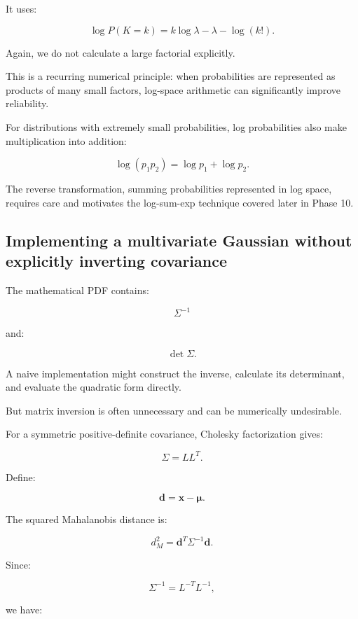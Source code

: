 It uses:

\[
 \log P(K=k) = k\log\lambda-\lambda-\log(k!).
\]

Again, we do not calculate a large factorial explicitly.

This is a recurring numerical principle: when probabilities are represented as products of many small factors, log-space arithmetic can significantly improve reliability.

For distributions with extremely small probabilities, log probabilities also make multiplication into addition:

\[
 \log(p_1p_2)=\log p_1+\log p_2.
\]

The reverse transformation, summing probabilities represented in log space, requires care and motivates the log-sum-exp technique covered later in Phase 10.

\subsection{Implementing a multivariate Gaussian without explicitly inverting covariance}\label{02-foundations-ii-ch031-implementing-a-multivariate-gaussian-without-explicitly-inverting-covariance}

\hypertarget{02-foundations-ii-ch031-implementing-a-multivariate-gaussian-without-explicitly-inverting-covariance}{}

The mathematical PDF contains:

\[
 \Sigma^{-1}
\]

and:

\[
 \det\Sigma.
\]

A naive implementation might construct the inverse, calculate its determinant, and evaluate the quadratic form directly.

But matrix inversion is often unnecessary and can be numerically undesirable.

For a symmetric positive-definite covariance, Cholesky factorization gives:

\[
 \boxed{\Sigma=LL^T}.
\]

Define:

\[
 \mathbf d=\mathbf x-\boldsymbol\mu.
\]

The squared Mahalanobis distance is:

\[
 d_M^2=\mathbf d^T\Sigma^{-1}\mathbf d.
\]

Since:

\[
 \Sigma^{-1}=L^{-T}L^{-1},
\]

we have:

